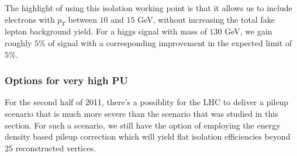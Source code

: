 The highlight of using this isolation working point is that it allows us to include electrons 
with $p_{T}$ between $10$ and $15$ GeV, without increasing the total fake lepton background
yield. For a higgs signal with mass of $130$ GeV, we gain roughly $5\%$ of signal with a 
corresponding improvement in the expected limit of $5\%$. 

\subsubsection{Options for very high PU}

For the second half of 2011, there's a possiblity for the LHC to deliver a pileup scenario
that is much more severe than the scenario that was studied in this section. For such a 
scenario, we still have the option of employing the energy density based pileup 
correction which will yield flat isolation efficiencies beyond $25$ reconstructed 
vertices.

